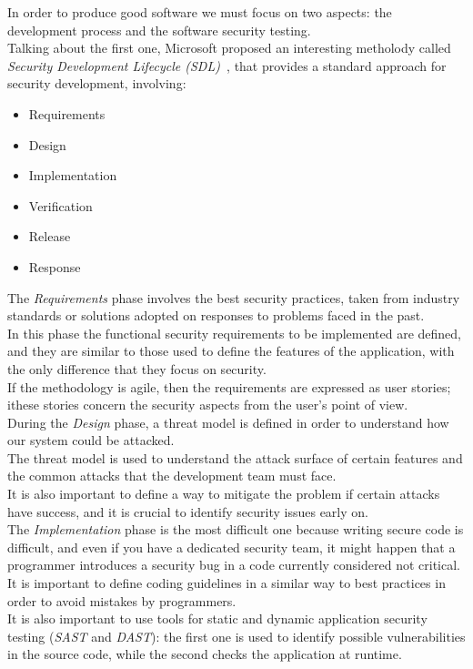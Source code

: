 \documentclass[12pt]{report}
\begin{document}
{In order to produce good software we must focus on two aspects: the development process and the software security testing.\\
Talking about the first one, Microsoft proposed an interesting metholody called \emph{Security Development Lifecycle (SDL)~}, that provides a standard approach for security development, involving:

\begin{itemize}
\setlength{\itemindent}{+4mm}
  \item Requirements
  \item Design
  \item Implementation
  \item Verification
  \item Release
  \item Response
\end{itemize}

The \emph{Requirements} phase involves the best security practices, taken from industry standards or solutions adopted on responses to problems faced in the past.\\
In this phase the functional security requirements to be implemented are defined, and they are similar to those used to define the features of the application, with the only difference that they focus on security.\\
If the methodology is agile, then the requirements are expressed as user stories; ithese stories concern the security aspects from the user's point of view.\\

During the \emph{Design} phase, a threat model is defined in order to understand how our system could be attacked.\\
The threat model is used to understand the attack surface of certain features and the common attacks that the development team must face.\\
It is also important to define a way to mitigate the problem if certain attacks have success, and it is crucial to identify security issues early on.\\

The \emph{Implementation} phase is the most difficult one because writing secure code is difficult, and even if you have a dedicated security team, it might happen that a programmer introduces a security bug in a code currently considered not critical.\\
It is important to define coding guidelines in a similar way to best practices in order to avoid mistakes by programmers.\\
It is also important to use tools for static and dynamic application security testing (\emph{SAST} and \emph{DAST}): the first one is used to
identify possible vulnerabilities in the source code, while the second checks the application at runtime.\\

}
\end{document}
